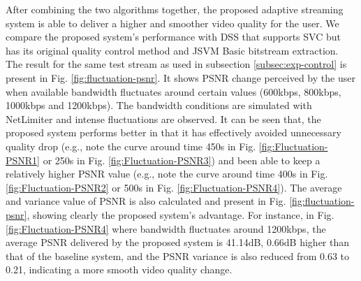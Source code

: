 \documentclass[journal]{IEEEtran}
\begin{document}
After combining the two algorithms together, the proposed adaptive streaming system is able to deliver a higher and smoother video quality for the user. We compare the proposed system's performance with DSS that supports SVC but has its original quality control method and JSVM Basic bitstream extraction. The result for the same test stream as used in subsection \ref{subsec:exp-control} is present in Fig. \ref{fig:fluctuation-psnr}. It shows PSNR change perceived by the user when available bandwidth fluctuates around certain values (600kbps, 800kbps, 1000kbps and 1200kbps). The bandwidth conditions are simulated with NetLimiter and intense fluctuations are observed. It can be seen that, the proposed system performs better in that it has effectively avoided unnecessary quality drop (e.g., note the curve around time 450s in Fig. \ref{fig:Fluctuation-PSNR1} or 250s in Fig. \ref{fig:Fluctuation-PSNR3}) and been able to keep a relatively higher PSNR value (e.g., note the curve around time 400s in Fig. \ref{fig:Fluctuation-PSNR2} or 500s in Fig. \ref{fig:Fluctuation-PSNR4}). The average and variance value of PSNR is also calculated and present in Fig. \ref{fig:fluctuation-psnr}, showing clearly the proposed system's advantage. For instance, in Fig. \ref{fig:Fluctuation-PSNR4} where bandwidth fluctuates around 1200kbps, the average PSNR delivered by the proposed system is 41.14dB, 0.66dB higher than that of the baseline system, and the PSNR variance is also reduced from 0.63 to 0.21, indicating a more smooth video quality change.
\end{document}

